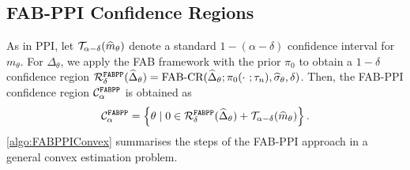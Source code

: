 \subsection{FAB-PPI Confidence Regions}\label{sec:fabppi_cr}
As in PPI, let $\mathcal T_{\alpha-\delta}(\widehat m_\theta)$ denote a standard $1-(\alpha-\delta)$ confidence interval for $m_\theta$.
For $\Delta_\theta$, we apply the FAB framework with the prior $\pi_0$ to obtain a $1-\delta$ confidence region $\mathcal R^{\mathrm{\texttt{FABPP}}}_\delta(\widehat\Delta_\theta)=\text{FAB-CR}(\widehat\Delta_\theta;\pi_0(\cdot~;\tau_n),\widehat\sigma_\theta,\delta)$.
Then, the FAB-PPI confidence region $\mathcal C_\alpha^{\mathrm{\texttt{FABPP}}}$ is obtained as
\begin{align}
    \mathcal C_\alpha^{\mathrm{\texttt{FABPP}}}=\left\{\theta \mid 0\in \mathcal R^{\mathrm{\texttt{FABPP}}}_\delta(\widehat\Delta_\theta) + \mathcal T_{\alpha-\delta}(\widehat m_\theta)\right\}.
    \label{eq:fabppiconfidenceinterval}
\end{align}
\cref{algo:FABPPIConvex} summarises the steps of the FAB-PPI approach in a general convex estimation problem.
